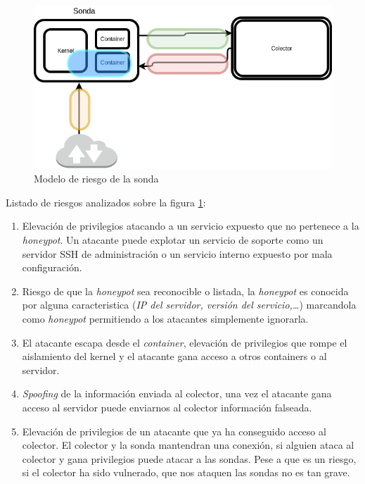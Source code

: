 \begin{figure}[!h]
  \centering
    \includegraphics[scale=0.4]{images/threat_model_probe}
  \caption{Modelo de riesgo de la sonda}
  \label{fig:riesgo_sonda}
\end{figure}

Listado de riesgos analizados sobre la figura \ref{fig:riesgo_sonda}:
\begin{enumerate}
    \item[\emph{Naranja 1}] Elevación de privilegios atacando a un servicio expuesto que no pertenece a la \emph{honeypot}. Un atacante puede explotar un servicio de soporte como un servidor SSH de administración o un servicio interno expuesto por mala configuración.
    \item[\emph{Naranja 2}] Riesgo de que la \emph{honeypot} sea reconocible o listada, la \emph{honeypot} es conocida por alguna caracteristica (\emph{IP del servidor, versión del servicio,\ldots}) marcandola como \emph{honeypot} permitiendo a los atacantes simplemente ignorarla.
    \item[\emph{Azul}] El atacante escapa desde el \emph{container}, elevación de privilegios que rompe el aislamiento del kernel y el atacante gana acceso a otros containers o al servidor.
    \item[\emph{Verde}] \emph{Spoofing} de la información enviada al colector, una vez el atacante gana acceso al servidor puede enviarnos al colector información falseada.
    \item[\emph{Rojo}] Elevación de privilegios de un atacante que ya ha conseguido acceso al colector. El colector y la sonda mantendran una conexión, si alguien ataca al colector y gana privilegios puede atacar a las sondas. Pese a que es un riesgo, si el colector ha sido vulnerado, que nos ataquen las sondas no es tan grave.
\end{enumerate}

